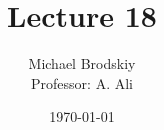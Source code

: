 


\title{Lecture 18}
\date{\today}
\author{Michael Brodskiy\\ \small Professor: A. Ali}



\maketitle

